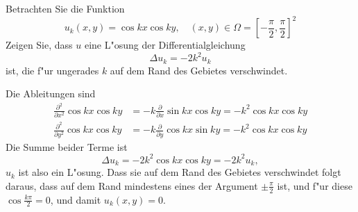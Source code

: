 Betrachten Sie die Funktion
\[
u_k(x,y)
=
\cos kx\cos ky,\quad (x,y)\in\Omega=\left[-\frac{\pi}2,\frac{\pi}2\right]^2
\]
Zeigen Sie, dass $u$ eine L"osung der Differentialgleichung
\[
\Delta u_k=-2k^2 u_k
\]
ist, die f"ur ungerades $k$ auf dem Rand des Gebietes verschwindet.

\begin{loesung}
Die Ableitungen sind
\begin{align*}
\frac{\partial^2}{\partial x^2}\cos kx\cos ky
&=
-k\frac{\partial}{\partial x}\sin kx\cos ky
=
-k^2\cos kx\cos ky
\\
\frac{\partial^2}{\partial y^2}\cos kx\cos ky
&=
-k\frac{\partial}{\partial y}\cos kx\sin ky
=
-k^2\cos kx\cos ky
\end{align*}
Die Summe beider Terme ist
\[
\Delta u_k=-2k^2 \cos kx\cos ky=-2k^2u_k,
\]
$u_k$ ist also ein L"osung. Dass sie auf dem Rand des Gebietes
verschwindet folgt daraus, dass auf dem Rand mindestens eines
der Argument $\pm\frac{\pi}2$ ist, und f"ur diese $\cos \frac{k\pi}2=0$,
und damit $u_k(x,y)=0$.
\end{loesung}
